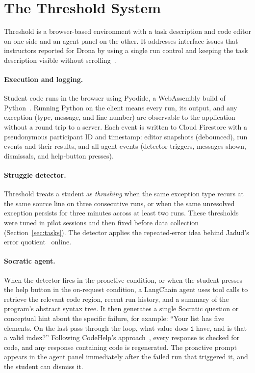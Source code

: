 \documentclass[manuscript,review]{acmart}
\begin{document}
\section{The Threshold System}
\label{sec:system}
Threshold is a browser-based environment with a task description and code editor on one side and an agent panel on the other. It addresses interface issues that instructors reported for Drona by using a single run control and keeping the task description visible without scrolling~\cite{abdullahi2026instructors}.

\paragraph{Execution and logging.} Student code runs in the browser using Pyodide, a WebAssembly build of Python~\cite{pyodide}. Running Python on the client means every run, its output, and any exception (type, message, and line number) are observable to the application without a round trip to a server. Each event is written to Cloud Firestore with a pseudonymous participant ID and timestamp: editor snapshots (debounced), run events and their results, and all agent events (detector triggers, messages shown, dismissals, and help-button presses).

\paragraph{Struggle detector.} Threshold treats a student as \emph{thrashing} when the same exception type recurs at the same source line on three consecutive runs, or when the same unresolved exception persists for three minutes across at least two runs. These thresholds were tuned in pilot sessions and then fixed before data collection (Section~\ref{sec:tasks}). The detector applies the repeated-error idea behind Jadud's error quotient~\cite{jadud2006methods} online.

\paragraph{Socratic agent.} When the detector fires in the proactive condition, or when the student presses the help button in the on-request condition, a LangChain agent uses tool calls to retrieve the relevant code region, recent run history, and a summary of the program's abstract syntax tree. It then generates a single Socratic question or conceptual hint about the specific failure, for example: ``Your list has five elements. On the last pass through the loop, what value does \texttt{i} have, and is that a valid index?'' Following CodeHelp's approach~\cite{liffiton2023codehelp}, every response is checked for code, and any response containing code is regenerated. The proactive prompt appears in the agent panel immediately after the failed run that triggered it, and the student can dismiss it.
\end{document}
